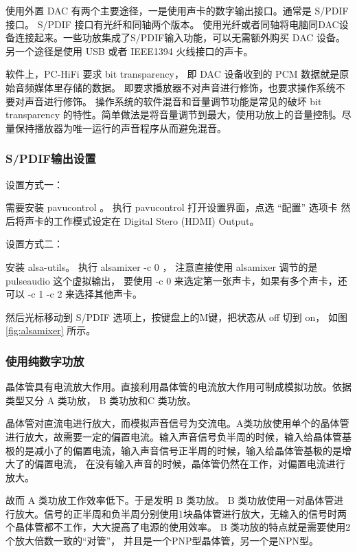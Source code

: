 使用外置 DAC 有两个主要途径，一是使用声卡的数字输出接口。通常是 S/PDIF 接口。 S/PDIF 接口有光纤和同轴两个版本。
使用光纤或者同轴将电脑同DAC设备连接起来。一些功放集成了S/PDIF输入功能，可以无需额外购买 DAC 设备。
另一个途径是使用 USB 或者 IEEE1394 火线接口的声卡。

软件上，PC-HiFi 要求 bit transparency， 即 DAC 设备收到的 PCM 数据就是原始音频媒体里存储的数据。 即要求播放器不对声音进行修饰，也要求操作系统不要对声音进行修饰。 操作系统的软件混音和音量调节功能是常见的破坏 bit transparency 的特性。简单做法是将音量调节到最大，使用功放上的音量控制。尽量保持播放器为唯一运行的声音程序从而避免混音。

\subsubsection*{S/PDIF输出设置}

设置方式一：

需要安装 pavucontrol 。 执行 pavucontrol 打开设置界面，点选  “配置” 选项卡
然后将声卡的工作模式设定在 Digital Stero (HDMI) Output。

设置方式二：

安装 alsa-utils。 执行 alsamixer -c  0 ， 注意直接使用  alsamixer 调节的是 pulseaudio 这个虚拟输出， 要使用 -c 0 来选定第一张声卡，如果有多个声卡，还可以 -c 1 -c 2 来选择其他声卡。


然后光标移动到 S/PDIF 选项上，按键盘上的M键，把状态从 off 切到 on， 如图 \ref{fig:alsamixer} 所示。

\subsubsection*{使用纯数字功放}

晶体管具有电流放大作用。直接利用晶体管的电流放大作用可制成模拟功放。依据类型又分 A 类功放， B 类功放和C 类功放。

晶体管对直流电进行放大，而模拟声音信号为交流电。A类功放使用单个的晶体管进行放大，故需要一定的偏置电流。输入声音信号负半周的时候，输入给晶体管基极的是减小了的偏置电流，输入声音信号正半周的时候，输入给晶体管基极的是增大了的偏置电流，  在没有输入声音的时候，晶体管仍然在工作，对偏置电流进行放大。

故而 A 类功放工作效率低下。于是发明 B 类功放。
B 类功放使用一对晶体管进行放大。信号的正半周和负半周分别使用1块晶体管进行放大，无输入的信号时两个晶体管都不工作，大大提高了电源的使用效率。
B 类功放的特点就是需要使用2个放大倍数一致的“对管”，
并且是一个PNP型晶体管，另一个是NPN型。

